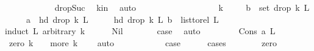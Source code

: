 \begin{isabellebody}
\ \ \ \ \ \ \ \ \ \ \isamarkupfalse%
\ drop{\isacharunderscore}{\kern0pt}Suc\ \isamarkupfalse%
\ k{\isacharunderscore}{\kern0pt}in\ \isamarkupfalse%
\ auto\ \isanewline
\ \ \ \ \ \ \isamarkupfalse%
\isanewline
\ \ \ \ \isamarkupfalse%
\isanewline
\ \ \isamarkupfalse%
\isanewline
{}\isamarkupfalse%
\isanewline
\ \ \isamarkupfalse%
\ k\ \isanewline
\ \ \isamarkupfalse%
\ {\isachardoublequoteopen}b\ {\isasymin}\ set\ {\isacharparenleft}{\kern0pt}drop\ k\ L{\isacharparenright}{\kern0pt}{\isachardoublequoteclose}\isanewline
\ \ \ \ \ {\isachardoublequoteopen}a\ {\isacharequal}{\kern0pt}\ hd\ {\isacharparenleft}{\kern0pt}drop\ k\ L{\isacharparenright}{\kern0pt}{\isachardoublequoteclose}\isanewline
\ \ \isamarkupfalse%
\ \isamarkupfalse%
\ {\isachardoublequoteopen}{\isacharparenleft}{\kern0pt}hd\ {\isacharparenleft}{\kern0pt}drop\ k\ L{\isacharparenright}{\kern0pt}{\isacharcomma}{\kern0pt}\ b{\isacharparenright}{\kern0pt}\ {\isasymin}\ list{\isacharunderscore}{\kern0pt}to{\isacharunderscore}{\kern0pt}rel\ L{\isachardoublequoteclose}\isanewline
\ \ \isamarkupfalse%
{\isacharparenleft}{\kern0pt}induct\ L\ arbitrary{\isacharcolon}{\kern0pt}\ k{\isacharparenright}{\kern0pt}\isanewline
\ \ \ \ \isamarkupfalse%
\ Nil\isanewline
\ \ \ \ \isamarkupfalse%
\ \isamarkupfalse%
\ {\isacharquery}{\kern0pt}case\ \isamarkupfalse%
\ auto\isanewline
\ \ \isamarkupfalse%
\isanewline
\ \ \ \ \isamarkupfalse%
\ {\isacharparenleft}{\kern0pt}Cons\ a\ L{\isacharparenright}{\kern0pt}\isanewline
\ \ \ \ \isamarkupfalse%
\ {\isacharparenleft}{\kern0pt}zero{\isacharparenright}{\kern0pt}\ {\isachardoublequoteopen}k\ {\isacharequal}{\kern0pt}\ {}{\isachardoublequoteclose}\ {\isacharbar}{\kern0pt}\ {\isacharparenleft}{\kern0pt}more{\isacharparenright}{\kern0pt}\ {\isachardoublequoteopen}k\ {\isachargreater}{\kern0pt}\ {}{\isachardoublequoteclose}\ \isamarkupfalse%
\ auto\ \ \ \ \isanewline
\ \ \ \ \isamarkupfalse%
\ \isamarkupfalse%
\ {\isacharquery}{\kern0pt}case\ \isanewline
\ \ \ \ \isamarkupfalse%
{\isacharparenleft}{\kern0pt}cases{\isacharparenright}{\kern0pt}\isanewline
\ \ \ \ \ \ \isamarkupfalse%
\ zero\isanewline
\ \ \ \ \ \ \isamarkupfalse%

\end{isabellebody}
